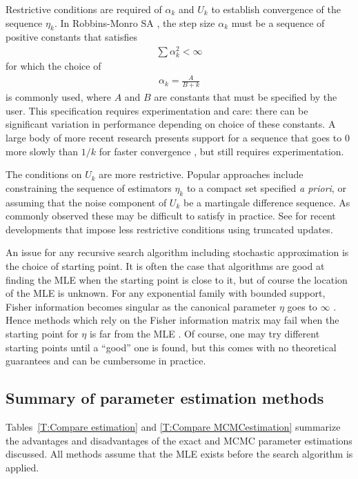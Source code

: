 Restrictive conditions are required of $\alpha_k$ and $U_k$ to establish convergence 
of the sequence $\eta_k$.  
In Robbins-Monro SA \citep{Robbins-Monro}, the step size $\alpha_k$ must be a sequence 
of positive constants 
that satisfies 
\begin{align*}
	\sum \alpha_k^2 < \infty
\end{align*}
for which the choice of
\begin{align} \label{E:SA step size}
	\alpha_k = \frac{A}{B + k}
\end{align}
 is commonly used, where $A$ and $B$ are constants that must be specified by the user.  
This specification requires experimentation and care: there can be significant 
variation in performance depending on choice of these constants. 
A large body of more recent research presents support for a sequence that goes to 0 
more slowly than $1/k$ 
for faster convergence \citep[Chapter 11]{Kushner:1997}, but still requires 
experimentation.  

The conditions on $U_k$ are more restrictive.  Popular approaches include constraining 
the sequence of estimators $\eta_k$ to a compact set specified \emph{a priori}, 
or assuming that the noise component of $U_k$ be a martingale 
difference sequence.  As commonly observed \citep*{Chen:2002,Andrieu:2005,Liang:2010} 
these may be 
difficult to satisfy in practice.  
See \citep{Andrieu:2005,Liang:2010} for recent developments that impose less 
restrictive conditions using truncated 
updates.

An issue for any recursive search algorithm including stochastic approximation is the 
choice of starting point.  It is 
often the case that algorithms are good at finding the MLE when the starting point is 
close to it, but of course the 
location of the MLE is unknown.  For any exponential family with bounded support, 
Fisher information 
becomes singular as the canonical parameter $\eta$ goes to $\infty$ \citep*{Rinaldo:2009}.
Hence methods which rely on 
the Fisher information matrix may fail when the starting point for $\eta$ is far from 
the MLE \citep{Younes:1989,Gu:2001}.
Of course, one may try different starting points until a ``good'' one is found, but 
this comes with no theoretical guarantees and can be cumbersome in practice.

\subsection{Summary of parameter estimation methods}
Tables~\ref{T:Compare estimation} and \ref{T:Compare MCMCestimation} summarize the advantages and disadvantages of the exact and MCMC parameter estimations discussed.  
All methods assume that the MLE exists before the search algorithm is applied.

